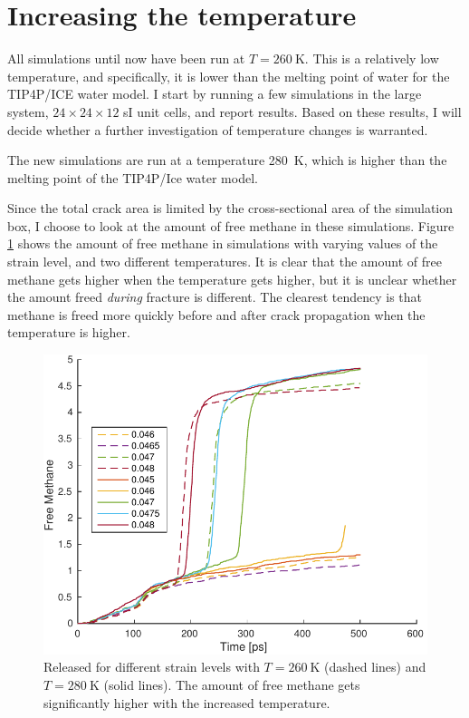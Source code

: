 \section{Increasing the temperature}
All simulations until now have been run at $T=\SI{260}{\kelvin}$. This is a relatively low temperature, and specifically, it is lower than the melting point of water for the TIP4P/ICE water model. I start by running a few simulations in the large system, $24\times 24\times 12$ sI unit cells, and report results. Based on these results, I will decide whether a further investigation of temperature changes is warranted.

The new simulations are run at a temperature \SI{280}{\kelvin}, which is higher than the melting point of the TIP4P/Ice water model. 

Since the total crack area is limited by the cross-sectional area of the simulation box, I choose to look at the amount of free methane in these simulations. Figure \ref{fig:released_methane_temp} shows the amount of free methane in simulations with varying values of the strain level, and two different temperatures. It is clear that the amount of free methane gets higher when the temperature gets higher, but it is unclear whether the amount freed \emph{during} fracture is different. The clearest tendency is that methane is freed more quickly before and after crack propagation when the temperature is higher. 

\begin{figure}
\centering
\includegraphics[width=12cm]{../figures/thesis/released_methane_temp.pdf}
\caption{Released for different strain levels with $T = \SI{260}{\kelvin}$ (dashed lines) and $T = \SI{280}{\kelvin}$ (solid lines). The amount of free methane gets significantly higher with the increased temperature.}
\label{fig:released_methane_temp}
\end{figure}

